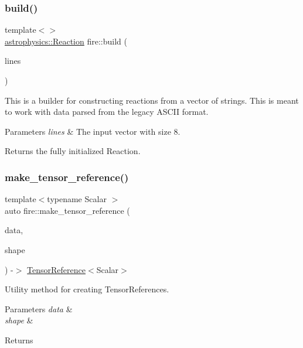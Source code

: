 \subsubsection{\texorpdfstring{build()}{build()}\hspace{0.1cm}{\footnotesize\ttfamily [6/6]}}
{\footnotesize\ttfamily template$<$$>$ \\
\hyperlink{a01349}{astrophysics\+::\+Reaction} fire\+::build (\begin{DoxyParamCaption}\item[{const vector$<$ string $>$ \&}]{lines }\end{DoxyParamCaption})}

This is a builder for constructing reactions from a vector of strings. This is meant to work with data parsed from the legacy A\+S\+C\+II format. 
\begin{DoxyParams}{Parameters}
{\em lines} & The input vector with size 8. \\
\hline
\end{DoxyParams}
\begin{DoxyReturn}{Returns}
the fully initialized Reaction. 
\end{DoxyReturn}
\mbox{\label{a00572_aaab26473f8b0cb78cff67ae06ff7ce80}} 
\subsubsection{\texorpdfstring{make\+\_\+tensor\+\_\+reference()}{make\_tensor\_reference()}}
{\footnotesize\ttfamily template$<$typename Scalar $>$ \\
auto fire\+::make\+\_\+tensor\+\_\+reference (\begin{DoxyParamCaption}\item[{Scalar $\ast$}]{data,  }\item[{\hyperlink{a01457}{Tensor\+Shape} \&}]{shape }\end{DoxyParamCaption}) -\/$>$ \hyperlink{a00572_a1bf491fd1c876e2808648b2fd291e3dd}{Tensor\+Reference}$<$Scalar$>$ }

Utility method for creating Tensor\+References.


\begin{DoxyParams}{Parameters}
{\em data} & \\
\hline
{\em shape} & \\
\hline
\end{DoxyParams}
\begin{DoxyReturn}{Returns}

\end{DoxyReturn}
\mbox{\label{a00572_a2b47cfd8a5d8711cdc55e1397487b90b}} 
